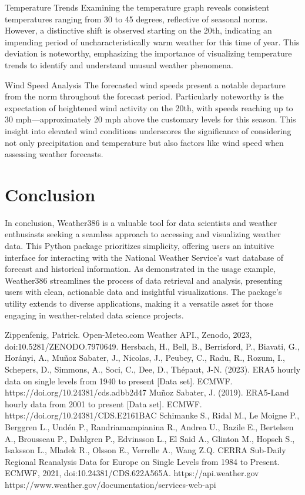 \documentclass[conference]{IEEEtran}
\begin{document}
Temperature Trends
Examining the temperature graph reveals consistent temperatures ranging from 30 to 45 degrees, reflective of seasonal norms. However, a distinctive shift is observed starting on the 20th, indicating an impending period of uncharacteristically warm weather for this time of year. This deviation is noteworthy, emphasizing the importance of visualizing temperature trends to identify and understand unusual weather phenomena.

Wind Speed Analysis
The forecasted wind speeds present a notable departure from the norm throughout the forecast period. Particularly noteworthy is the expectation of heightened wind activity on the 20th, with speeds reaching up to 30 mph—approximately 20 mph above the customary levels for this season. This insight into elevated wind conditions underscores the significance of considering not only precipitation and temperature but also factors like wind speed when assessing weather forecasts.

\section{Conclusion}
In conclusion, Weather386 is a valuable tool for data scientists and weather enthusiasts seeking a seamless approach to accessing and visualizing weather data. This Python package prioritizes simplicity, offering users an intuitive interface for interacting with the National Weather Service's vast database of forecast and historical information. As demonstrated in the usage example, Weather386 streamlines the process of data retrieval and analysis, presenting users with clean, actionable data and insightful visualizations. The package's utility extends to diverse applications, making it a versatile asset for those engaging in weather-related data science projects.

\begin{thebibliography}{00}
 Zippenfenig, Patrick. Open-Meteo.com Weather API., Zenodo, 2023, doi:10.5281/ZENODO.7970649.
 Hersbach, H., Bell, B., Berrisford, P., Biavati, G., Horányi, A., Muñoz Sabater, J., Nicolas, J., Peubey, C., Radu, R., Rozum, I., Schepers, D., Simmons, A., Soci, C., Dee, D., Thépaut, J-N. (2023). ERA5 hourly data on single levels from 1940 to present [Data set]. ECMWF. https://doi.org/10.24381/cds.adbb2d47
 Muñoz Sabater, J. (2019). ERA5-Land hourly data from 2001 to present [Data set]. ECMWF. https://doi.org/10.24381/CDS.E2161BAC
 Schimanke S., Ridal M., Le Moigne P., Berggren L., Undén P., Randriamampianina R., Andrea U., Bazile E., Bertelsen A., Brousseau P., Dahlgren P., Edvinsson L., El Said A., Glinton M., Hopsch S., Isaksson L., Mladek R., Olsson E., Verrelle A., Wang Z.Q. CERRA Sub-Daily Regional Reanalysis Data for Europe on Single Levels from 1984 to Present. ECMWF, 2021, doi:10.24381/CDS.622A565A.
 https://api.weather.gov https://www.weather.gov/documentation/services-web-api
\end{thebibliography}
\end{document}
